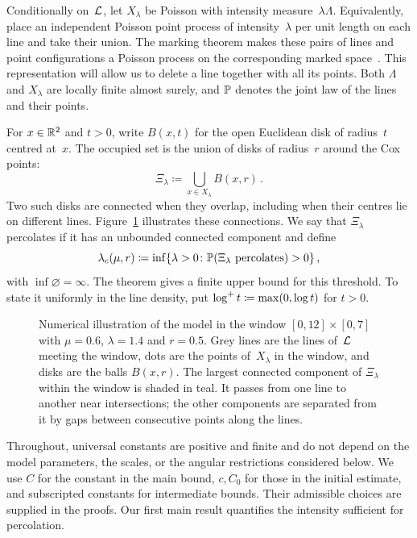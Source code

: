 \documentclass[11pt,letterpaper]{article}
\begin{document}
Conditionally on~$\cL$, let $X_\lambda$ be Poisson with intensity measure~$\lambda\Lambda$. Equivalently, place an independent Poisson point process of intensity~$\lambda$ per unit length on each line and take their union. The marking theorem makes these pairs of lines and point configurations a Poisson process on the corresponding marked space~\cite[Theorem~5.6]{LP17}. This representation will allow us to delete a line together with all its points. Both $\Lambda$ and $X_\lambda$ are locally finite almost surely, and $\P$ denotes the joint law of the lines and their points.

For $x\in\R^2$ and $t>0$, write $B(x,t)$ for the open Euclidean disk of radius~$t$ centred at~$x$. The occupied set is the union of disks of radius~$r$ around the Cox points:
\begin{equation}\label{eq:occupied-set}
  \Xi_\lambda\coloneqq\bigcup_{x\in X_\lambda}B(x,r)\,.
\end{equation}
Two such disks are connected when they overlap, including when their centres lie on different lines. Figure~\ref{fig:model} illustrates these connections. We say that $\Xi_\lambda$ percolates if it has an unbounded connected component and define
\begin{equation}\label{eq:critical-intensity}
  \lambda_c(\mu,r)\coloneqq\inf\{\lambda>0\colon\P(\Xi_\lambda\text{ percolates})>0\}\,,
\end{equation}
with $\inf\varnothing=\infty$. The theorem gives a finite upper bound for this threshold. To state it uniformly in the line density, put $\logp t\coloneqq\max(0,\log t)$ for $t>0$.

\begin{figure}[ht]
  \centering
  
  \caption{Numerical illustration of the model in the window $[0,12]\times[0,7]$ with $\mu=0.6$, $\lambda=1.4$ and $r=0.5$. Grey lines are the lines of~$\cL$ meeting the window, dots are the points of~$X_\lambda$ in the window, and disks are the balls $B(x,r)$. The largest connected component of $\Xi_\lambda$ within the window is shaded in teal. It passes from one line to another near intersections; the other components are separated from it by gaps between consecutive points along the lines.}
  \label{fig:model}
\end{figure}

Throughout, universal constants are positive and finite and do not depend on the model parameters, the scales, or the angular restrictions considered below. We use $C$ for the constant in the main bound, $c,C_0$ for those in the initial estimate, and subscripted constants for intermediate bounds. Their admissible choices are supplied in the proofs. Our first main result quantifies the intensity sufficient for percolation.
\end{document}
